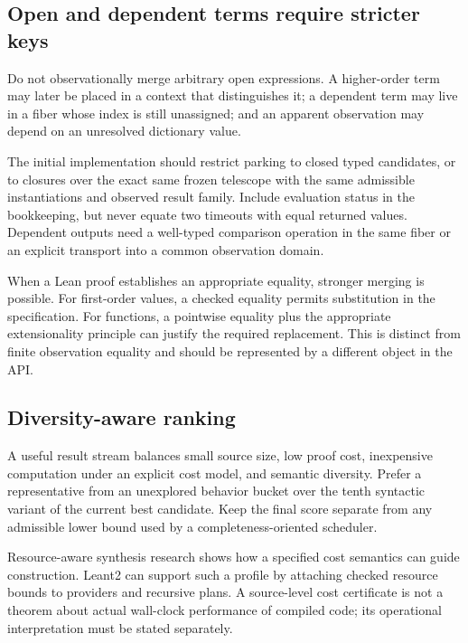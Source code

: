 \subsection{Open and dependent terms require stricter keys}
Do not observationally merge arbitrary open expressions. A higher-order term may later be placed in a context that distinguishes it; a dependent term may live in a fiber whose index is still unassigned; and an apparent observation may depend on an unresolved dictionary value.

The initial implementation should restrict parking to closed typed candidates, or to closures over the exact same frozen telescope with the same admissible instantiations and observed result family. Include evaluation status in the bookkeeping, but never equate two timeouts with equal returned values. Dependent outputs need a well-typed comparison operation in the same fiber or an explicit transport into a common observation domain.

When a Lean proof establishes an appropriate equality, stronger merging is possible. For first-order values, a checked equality permits substitution in the specification. For functions, a pointwise equality plus the appropriate extensionality principle can justify the required replacement. This is distinct from finite observation equality and should be represented by a different object in the API.

\subsection{Diversity-aware ranking}
A useful result stream balances small source size, low proof cost, inexpensive computation under an explicit cost model, and semantic diversity. Prefer a representative from an unexplored behavior bucket over the tenth syntactic variant of the current best candidate. Keep the final score separate from any admissible lower bound used by a completeness-oriented scheduler.

Resource-aware synthesis research shows how a specified cost semantics can guide construction. Leant2 can support such a profile by attaching checked resource bounds to providers and recursive plans. A source-level cost certificate is not a theorem about actual wall-clock performance of compiled code; its operational interpretation must be stated separately.\cite{resyn}

